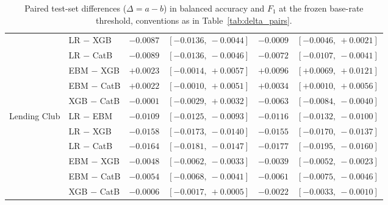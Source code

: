 \begin{table}[!t]
\begin{tabular}{@{}llrcrc@{}}
                 & LR $-$ XGB   & $-0.0087$ & $[-0.0136,\ -0.0044]$ & $-0.0009$ & $[-0.0046,\ +0.0021]$ \\
                 & LR $-$ CatB  & $-0.0089$ & $[-0.0136,\ -0.0046]$ & $-0.0072$ & $[-0.0107,\ -0.0041]$ \\
                 & EBM $-$ XGB  & $+0.0023$ & $[-0.0014,\ +0.0057]$ & $+0.0096$ & $[+0.0069,\ +0.0121]$ \\
                 & EBM $-$ CatB & $+0.0022$ & $[-0.0010,\ +0.0051]$ & $+0.0034$ & $[+0.0010,\ +0.0056]$ \\
                 & XGB $-$ CatB & $-0.0001$ & $[-0.0029,\ +0.0032]$ & $-0.0063$ & $[-0.0084,\ -0.0040]$ \\
\midrule
Lending Club     & LR $-$ EBM   & $-0.0109$ & $[-0.0125,\ -0.0093]$ & $-0.0116$ & $[-0.0132,\ -0.0100]$ \\
                 & LR $-$ XGB   & $-0.0158$ & $[-0.0173,\ -0.0140]$ & $-0.0155$ & $[-0.0170,\ -0.0137]$ \\
                 & LR $-$ CatB  & $-0.0164$ & $[-0.0181,\ -0.0147]$ & $-0.0177$ & $[-0.0195,\ -0.0160]$ \\
                 & EBM $-$ XGB  & $-0.0048$ & $[-0.0062,\ -0.0033]$ & $-0.0039$ & $[-0.0052,\ -0.0023]$ \\
                 & EBM $-$ CatB & $-0.0054$ & $[-0.0068,\ -0.0041]$ & $-0.0061$ & $[-0.0075,\ -0.0046]$ \\
                 & XGB $-$ CatB & $-0.0006$ & $[-0.0017,\ +0.0005]$ & $-0.0022$ & $[-0.0033,\ -0.0010]$ \\
\bottomrule
\end{tabular}
\caption[Paired differences in balanced accuracy and $F_1$]{Paired test-set differences
  ($\Delta=a-b$) in balanced accuracy and $F_1$ at the frozen base-rate threshold,
  conventions as in Table~\ref{tab:delta_pairs}.}
\label{tab:delta_pairs_threshold}
\end{table}

\endgroup

